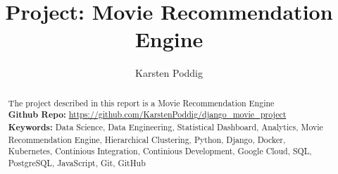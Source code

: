 \documentclass{article}
\title{Project: Movie Recommendation Engine}
\author{Karsten Poddig}
\begin{document}
\maketitle

\begin{abstract}
The project described in this report is a Movie Recommendation Engine\\

\textbf{Github Repo:} \url{https://github.com/KarstenPoddig/django_movie_project}\\

\textbf{Keywords:} Data Science, Data Engineering, Statistical Dashboard, Analytics, Movie Recommendation Engine, Hierarchical Clustering,  Python, Django, Docker, Kubernetes, Continious Integration, Continious Development, Google Cloud, SQL, PostgreSQL, JavaScript, Git, GitHub


\end{abstract}
\end{document}
